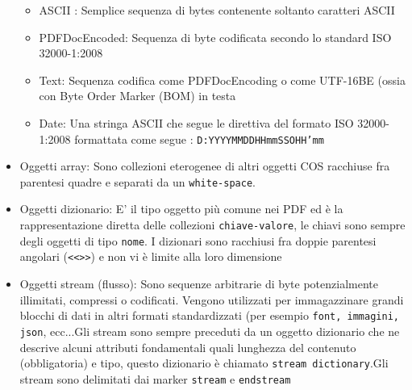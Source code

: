 \begin{itemize}
		\begin{itemize}
		\item ASCII : Semplice sequenza di bytes contenente soltanto caratteri ASCII
		\item PDFDocEncoded: Sequenza di byte codificata secondo lo standard ISO 32000-1:2008 
		\item Text: Sequenza codifica come PDFDocEncoding o come UTF-16BE (ossia con Byte Order Marker (BOM) in testa
		\item Date: Una stringa ASCII che segue le direttiva del formato ISO 32000-1:2008 formattata come segue : \texttt{D:YYYYMMDDHHmmSSOHH’mm}
	\end{itemize}
	 \item Oggetti array: Sono collezioni eterogenee di altri oggetti COS racchiuse fra parentesi quadre e separati da un \texttt{white-space}.
	 \item Oggetti dizionario: E' il tipo oggetto più comune nei PDF ed è la rappresentazione diretta delle collezioni \texttt{chiave-valore}, le chiavi sono sempre degli oggetti di tipo \texttt{nome}. I dizionari sono racchiusi fra doppie parentesi angolari (\texttt{<<>>}) e non vi è limite alla loro dimensione
	 \item Oggetti stream (flusso): Sono sequenze arbitrarie di byte potenzialmente illimitati, compressi o codificati. Vengono utilizzati per immagazzinare grandi blocchi di dati in altri formati standardizzati (per esempio \texttt{font, immagini, json}, ecc...\newline Gli stream sono sempre preceduti da un oggetto dizionario che ne descrive alcuni attributi fondamentali quali lunghezza del contenuto (obbligatoria) e tipo, questo dizionario è chiamato \texttt{stream dictionary}.\newline Gli stream sono delimitati dai marker \texttt{stream} e \texttt{endstream}
	\end{itemize}

















